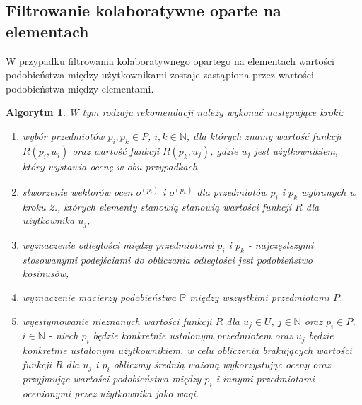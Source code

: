 \documentclass[12pt,a4paper]{report}
\newtheorem{algorytm}[df]{Algorytm}
\newcommand{\setN}{\mathbb{N}}
\newcommand{\setUzytkownicy}{\mathit{U}}
\newcommand{\setPrzedmioty}{\mathit{P}}
\begin{document}
\subsection{Filtrowanie kolaboratywne oparte na  elementach}
W przypadku filtrowania kolaboratywnego opartego na elementach wartości podobieństwa między użytkownikami zostaje zastąpiona przez wartości podobieństwa między elementami.

\begin{algorytm}
W tym rodzaju rekomendacji należy wykonać następujące kroki:
\begin{enumerate}
\item wybór przedmiotów $p_i, p_k \in \setPrzedmioty$, $i,k \in \setN$, dla których znamy wartość funkcji $R(p_i,u_j)$ oraz wartość funkcji $R(p_k,u_j)$, gdzie $u_j$ jest użytkownikiem, który wystawia ocenę w obu przypadkach,
\item stworzenie wektorów ocen $\overline{o^{(p_i)}}$ i $\overline{o^{(p_k)}}$ dla przedmiotów $p_i$ i $p_k$ wybranych w kroku 2., których elementy stanowią stanowią wartości funkcji $R$ dla użytkownika $u_j$,
\item wyznaczenie odległości między przedmiotami $p_i$ i $p_k$ - najczęstszymi stosowanymi podejściami do obliczania odległości jest podobieństwo kosinusów,
\item wyznaczenie macierzy podobieństwa $\mathbb{P}$ między wszystkimi przedmiotami $\setPrzedmioty$,
\item wyestymowanie nieznanych wartości funkcji $R$ dla $u_j \in \setUzytkownicy$, $j \in \setN$ oraz $p_i \in \setPrzedmioty$, $i \in \setN$  - niech $p_i$ będzie konkretnie ustalonym przedmiotem oraz $u_j$ będzie konkretnie ustalonym użytkownikiem, w celu obliczenia brakujących wartości funkcji $R$ dla $u_j$ i $p_i$ obliczmy średnią ważoną wykorzystując oceny oraz przyjmując wartości podobieństwa między $p_i$ i innymi przedmiotami ocenionymi przez użytkownika jako wagi.
\end{enumerate}
\end{algorytm}
\end{document}
